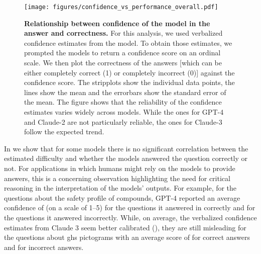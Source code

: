 \documentclass[11pt, oneside]{article}
\begin{document}
\begin{refsection}
\begin{figure}
    \centering
    \texttt{[image: figures/confidence\_vs\_performance\_overall.pdf]}
    \caption{\textbf{Relationship between confidence of the model in the answer and correctness.} For this analysis, we used verbalized confidence estimates from the model. To obtain those estimates, we prompted the models to return a confidence score on an ordinal scale. We then plot the correctness of the answers [which can be either completely correct (1) or completely incorrect (0)] against the confidence score.
        The stripplots show the individual data points, the lines show the mean and the errorbars show the standard error of the mean. The figure shows that the reliability of the confidence estimates varies widely across models. While the ones for GPT-4 and Claude-2 are not particularly reliable, the ones for Claude-3 follow the expected trend.}
    \label{fig:confidence_vs_performance}
\end{figure}

In  we show that for some models there is no significant correlation between the estimated difficulty and whether the models answered the question correctly or not.
For applications in which humans might rely on the models to provide answers, this is a concerning observation highlighting the need for critical reasoning in the interpretation of the models' outputs.\autocite{Li_2023}
For example, for the questions about the safety profile of compounds, GPT-4 reported an average confidence of  (on a scale of 1--5) for the  questions it answered in correctly and  for the  questions it answered incorrectly.
While, on average, the verbalized confidence estimates from Claude 3 seem better calibrated (), they are still misleading for the questions about \gls{ghs} pictograms with an average score of  for correct answers and  for incorrect answers.


\end{refsection}
\end{document}

